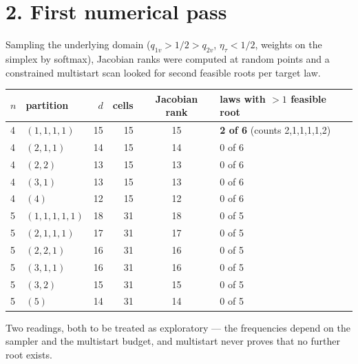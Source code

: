 \documentclass[11pt]{article}
\theoremstyle{remark}
\begin{document}
\section*{2. First numerical pass}

Sampling the underlying domain ($q_{1v}>1/2>q_{2v}$, $\eta_\tau<1/2$, weights on the simplex by softmax), Jacobian ranks were computed at random points and a constrained multistart scan looked for second feasible roots per target law.

\begin{center}\small
\begin{tabular}{@{}llrrcl@{}}
\toprule
$n$ & partition & $d$ & cells & Jacobian rank & laws with $>1$ feasible root\\
\midrule
4 & $(1,1,1,1)$ & 15 & 15 & 15 & \textbf{2 of 6} (counts 2,1,1,1,1,2)\\
4 & $(2,1,1)$   & 14 & 15 & 14 & 0 of 6\\
4 & $(2,2)$     & 13 & 15 & 13 & 0 of 6\\
4 & $(3,1)$     & 13 & 15 & 13 & 0 of 6\\
4 & $(4)$       & 12 & 15 & 12 & 0 of 6\\
\midrule
5 & $(1,1,1,1,1)$ & 18 & 31 & 18 & 0 of 5\\
5 & $(2,1,1,1)$   & 17 & 31 & 17 & 0 of 5\\
5 & $(2,2,1)$     & 16 & 31 & 16 & 0 of 5\\
5 & $(3,1,1)$     & 16 & 31 & 16 & 0 of 5\\
5 & $(3,2)$       & 15 & 31 & 15 & 0 of 5\\
5 & $(5)$         & 14 & 31 & 14 & 0 of 5\\
\bottomrule
\end{tabular}
\end{center}

Two readings, both to be treated as exploratory --- the frequencies depend on the sampler and the multistart budget, and multistart never proves that no further root exists.
\end{document}
